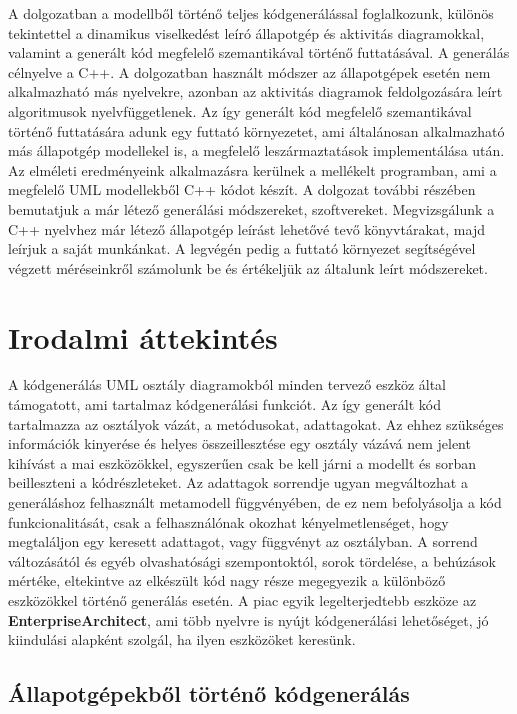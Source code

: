 \documentclass[a4paper,12pt]{report}
\begin{document}
A dolgozatban a modellből történő teljes kódgenerálással foglalkozunk, különös tekintettel a dinamikus viselkedést leíró állapotgép és aktivitás diagramokkal, valamint a generált kód megfelelő szemantikával történő futtatásával.
A generálás célnyelve a C++. A dolgozatban használt módszer az állapotgépek esetén nem alkalmazható más nyelvekre, azonban az aktivitás diagramok feldolgozására leírt algoritmusok nyelvfüggetlenek.
Az így generált kód megfelelő szemantikával történő futtatására adunk egy futtató környezetet, ami általánosan alkalmazható más állapotgép modellekel is, a megfelelő leszármaztatások implementálása után. 
Az elméleti eredményeink alkalmazásra kerülnek a mellékelt programban, ami a megfelelő UML modellekből C++ kódot készít. A dolgozat további részében bemutatjuk a már létező generálási módszereket, szoftvereket. 
Megvizsgálunk a C++ nyelvhez már létező állapotgép leírást lehetővé tevő könyvtárakat, majd leírjuk a saját munkánkat.
A legvégén pedig a futtató környezet segítségével végzett méréseinkről számolunk be és értékeljük az általunk leírt módszereket.

\chapter{Irodalmi áttekintés}

A kódgenerálás UML osztály diagramokból minden tervező eszköz által támogatott, ami tartalmaz kódgenerálási funkciót. Az így generált kód tartalmazza az osztályok vázát, a metódusokat, adattagokat. Az ehhez szükséges információk kinyerése és helyes összeillesztése egy
osztály vázává nem jelent kihívást a mai eszközökkel, egyszerűen csak be kell járni a modellt és sorban beilleszteni a kódrészleteket. Az adattagok sorrendje ugyan megváltozhat a generáláshoz felhasznált metamodell függvényében, de ez nem befolyásolja a kód funkcionalitását,
csak a felhasználónak okozhat kényelmetlenséget, hogy megtaláljon egy keresett adattagot, vagy függvényt az osztályban. A sorrend változásától és egyéb olvashatósági szempontoktól, sorok tördelése, a behúzások mértéke, eltekintve az elkészült kód nagy része megegyezik a különböző eszközökkel történő generálás esetén. A piac egyik legelterjedtebb eszköze az {\bf EnterpriseArchitect}\cite{ea}, ami több nyelvre is nyújt kódgenerálási lehetőséget, jó kiindulási alapként szolgál, ha ilyen eszközöket keresünk.

\section{Állapotgépekből történő kódgenerálás}
\end{document}
